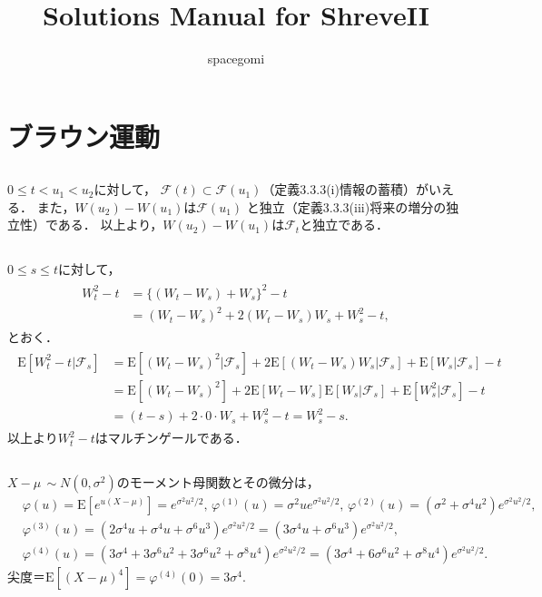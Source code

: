 \documentclass[a4paper,11pt]{jsarticle}
\title{Solutions Manual for ShreveII}
\author{spacegomi}
\date{}
\newcommand{\E}{\mathrm{E}}
\newcommand{\F}{\mathcal{F}}
\newcommand{\1}{\mbox{1}\hspace{-0.30em}\mbox{1}}
\begin{document}
\maketitle
\pagestyle{fancy}
\setcounter{section}{2}
\section{ブラウン運動}
\subsection{}
$0 \leq t < u_1 < u_2$に対して，
$\mathcal{F}(t)\subset\mathcal{F}(u_1)$（定義3.3.3(i)情報の蓄積）がいえる．
また，$W(u_2)-W(u_1)$は$\mathcal{F}(u_1)$
と独立（定義3.3.3(iii)将来の増分の独立性）である．
以上より，$W(u_2)-W(u_1)$は$\F_t$と独立である．

\subsection{} %
$0\leq s\leq t$に対して，
\begin{align*}
  \begin{split}
    W_t^2-t&=\{(W_t-W_s)+W_s\}^2-t \\
    &=(W_t-W_s)^2+2(W_t-W_s)W_s+W_s^2-t,
  \end{split}
\end{align*}
とおく．
\begin{align*}
  \begin{split}
    \E[W_t^2-t|\mathcal{F}_s]
    &=\E[(W_t-W_s)^2|\mathcal{F}_s]
    +2\E[(W_t-W_s)W_s|\mathcal{F}_s]
    +\E[W_s|\mathcal{F}_s]-t \\
    &=\E[(W_t-W_s)^2]+2\E[W_t-W_s]\E[W_s|\F_s]+\E[W_s^2|\F_s]-t\\
    &=(t-s)+2\cdot0\cdot W_s+W_s^2-t=W_s^2-s.
  \end{split}
\end{align*}
以上より$W_t^2-t$はマルチンゲールである．

\subsection{} %
$X-\mu \, \sim N(0,\sigma^2)$のモーメント母関数とその微分は，
\begin{align*}
  &\varphi(u)=\E[e^{u(X-\mu)}]=e^{\sigma^2 u^2/2}, \,
  \varphi^{(1)}(u)=\sigma^2 u e^{\sigma^2 u^2/2}, \,
  \varphi^{(2)}(u)=(\sigma^2 + \sigma^4 u^2) e^{\sigma^2 u^2/2}, \\
  &\varphi^{(3)}(u)=(2\sigma^4 u + \sigma^4 u +\sigma^6 u^3)e^{\sigma^2 u^2/2}
  =(3\sigma^4 u + \sigma^6 u^3)e^{\sigma^2 u^2/2}, \\
  &\varphi^{(4)}(u)=(3\sigma^4 + 3\sigma^6 u^2 +3\sigma^6 u^2+ \sigma^8 u^4)
  e^{\sigma^2 u^2/2}
  =(3\sigma^4 + 6\sigma^6 u^2+ \sigma^8 u^4)e^{\sigma^2 u^2/2}.
\end{align*}
尖度＝$\E[(X-\mu)^4]=\varphi^{(4)}(0)=3\sigma^4$.
\end{document}
